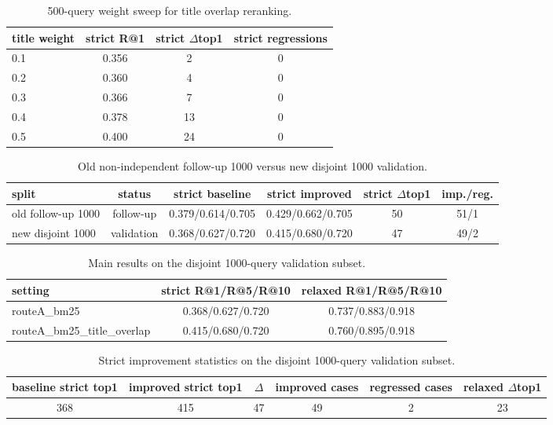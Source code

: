 \begin{table}[t]
\centering
\caption{500-query weight sweep for title overlap reranking.}
\begin{tabular}{lccc}
\hline
title weight & strict R@1 & strict $\Delta$top1 & strict regressions \\
\hline
0.1 & 0.356 & 2 & 0 \\
0.2 & 0.360 & 4 & 0 \\
0.3 & 0.366 & 7 & 0 \\
0.4 & 0.378 & 13 & 0 \\
0.5 & 0.400 & 24 & 0 \\
\hline
\end{tabular}
\end{table}

\begin{table}[t]
\centering
\caption{Old non-independent follow-up 1000 versus new disjoint 1000 validation.}
\begin{tabular}{lccccc}
\hline
split & status & strict baseline & strict improved & strict $\Delta$top1 & imp./reg. \\
\hline
old follow-up 1000 & follow-up & 0.379/0.614/0.705 & 0.429/0.662/0.705 & 50 & 51/1 \\
new disjoint 1000 & validation & 0.368/0.627/0.720 & 0.415/0.680/0.720 & 47 & 49/2 \\
\hline
\end{tabular}
\end{table}

\begin{table}[t]
\centering
\caption{Main results on the disjoint 1000-query validation subset.}
\begin{tabular}{lcc}
\hline
setting & strict R@1/R@5/R@10 & relaxed R@1/R@5/R@10 \\
\hline
routeA\_bm25 & 0.368/0.627/0.720 & 0.737/0.883/0.918 \\
routeA\_bm25\_title\_overlap & 0.415/0.680/0.720 & 0.760/0.895/0.918 \\
\hline
\end{tabular}
\end{table}

\begin{table}[t]
\centering
\caption{Strict improvement statistics on the disjoint 1000-query validation subset.}
\begin{tabular}{cccccc}
\hline
baseline strict top1 & improved strict top1 & $\Delta$ & improved cases & regressed cases & relaxed $\Delta$top1 \\
\hline
368 & 415 & 47 & 49 & 2 & 23 \\
\hline
\end{tabular}
\end{table}


